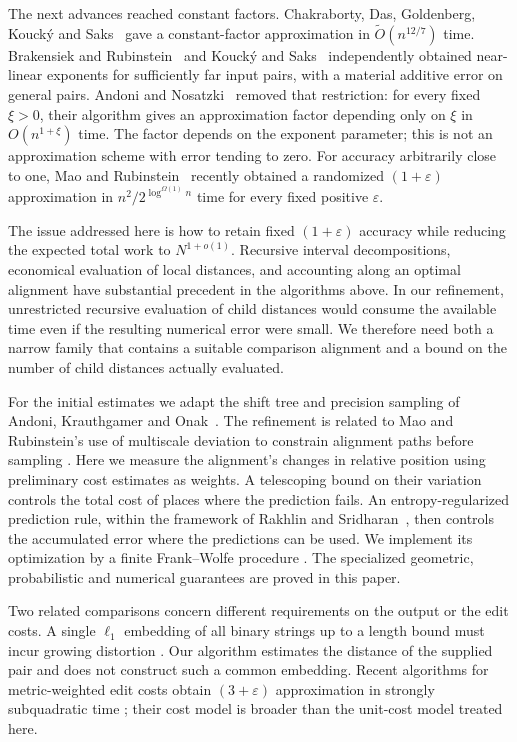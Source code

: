 The next advances reached constant factors. Chakraborty, Das,
Goldenberg, Kouck\'y and Saks~\cite{ChakrabortyEtAl2020} gave a
constant-factor approximation in $\widetilde O(n^{12/7})$ time.
Brakensiek and Rubinstein~\cite{BrakensiekRubinstein2020} and Kouck\'y
and Saks~\cite{KouckySaks2020} independently obtained near-linear
exponents for sufficiently far input pairs, with a material additive
error on general pairs. Andoni and Nosatzki~\cite{AndoniNosatzki2020}
removed that restriction: for every fixed $\xi>0$, their algorithm
gives an approximation factor depending only on $\xi$ in
$O(n^{1+\xi})$ time. The factor depends on the exponent parameter;
this is not an approximation scheme with error tending to zero.
For accuracy arbitrarily close to one, Mao and
Rubinstein~\cite[Theorem~6.1]{MaoRubinstein2026} recently obtained a
randomized $(1+\varepsilon)$ approximation in
$n^2/2^{\log^{\Omega(1)}n}$ time for every fixed positive
$\varepsilon$.

The issue addressed here is how to retain fixed $(1+\varepsilon)$
accuracy while reducing the expected total work to $N^{1+o(1)}$.
Recursive interval decompositions, economical evaluation of local
distances, and accounting along an optimal alignment have substantial
precedent in the algorithms above. In our refinement, unrestricted recursive evaluation of child distances would consume
the available time even if the resulting numerical error were small. We therefore need both a narrow family that
contains a suitable comparison alignment and a bound on the number of
child distances actually evaluated.

For the initial estimates we adapt the shift tree and precision sampling
of Andoni, Krauthgamer and
Onak~\cite{AndoniKrauthgamerOnak2010,AndoniKrauthgamerOnak2011}.
The refinement is related to Mao and Rubinstein's use of multiscale
deviation to constrain alignment paths before sampling
\cite{MaoRubinstein2026}. Here we measure the alignment's changes in relative position using
preliminary cost estimates as weights. A telescoping bound on their
variation controls the total cost of places where the prediction fails.
An entropy-regularized prediction rule, within the framework of
Rakhlin and Sridharan~\cite{RakhlinSridharan2013}, then controls the
accumulated error where the predictions can be used. We implement its
optimization by a finite Frank--Wolfe procedure
\cite{FrankWolfe1956,Jaggi2013}. The specialized geometric, probabilistic
and numerical guarantees are proved in this paper.

Two related comparisons concern different requirements on the output or
the edit costs. A single $\ell_1$ embedding of all binary strings up to a
length bound must incur growing distortion
\cite[Theorem~1.1]{OpenAIEditDistortion2026}. Our algorithm estimates the
distance of the supplied pair and does not construct such a common
embedding. Recent algorithms for metric-weighted edit costs obtain
$(3+\varepsilon)$ approximation in strongly subquadratic time
\cite{MaderTavasoliWang2026,DasKipouridisKociumaka2026}; their cost model
is broader than the unit-cost model treated here.

